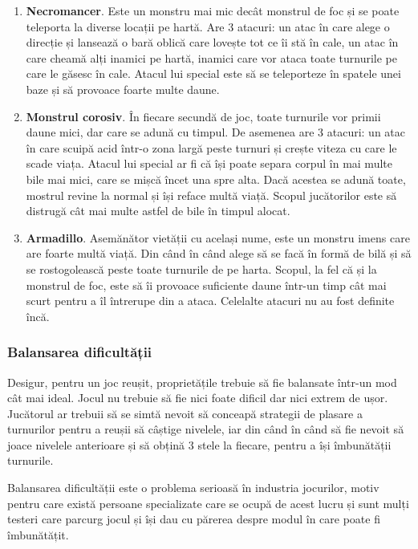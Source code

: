 \documentclass[12pt, a4paper]{article}
\begin{document}
	\begin{enumerate}
		\item \textbf{Necromancer}. Este un monstru mai mic decât monstrul de foc și se poate teleporta la diverse locații pe hartă. Are 3 atacuri: un atac în care alege o direcție și lansează o bară oblică care lovește tot ce îi stă în cale, un atac în care cheamă alți inamici pe hartă, inamici care vor ataca toate turnurile pe care le găsesc în cale. Atacul lui special este să se teleporteze în spatele unei baze și să provoace foarte multe daune.
		\item \textbf{Monstrul corosiv}. În fiecare secundă de joc, toate turnurile vor primii daune mici, dar care se adună cu timpul. De asemenea are 3 atacuri: un atac în care scuipă acid într-o zona largă peste turnuri și crește viteza cu care le scade viața. Atacul lui special ar fi că își poate separa corpul în mai multe bile mai mici, care se mișcă încet una spre alta. Dacă acestea se adună toate, mostrul revine la normal și își reface multă viață. Scopul jucătorilor este să distrugă cât mai multe astfel de bile în timpul alocat.
		\item \textbf{Armadillo}. Asemănător vietății cu același nume, este un monstru imens care are foarte multă viață. Din când în când alege să se facă în formă de bilă și să se rostogolească peste toate turnurile de pe harta. Scopul, la fel că și la monstrul de foc, este să îi provoace suficiente daune într-un timp cât mai scurt pentru a îl întrerupe din a ataca. Celelalte atacuri nu au fost definite încă.
	\end{enumerate}
	
	
	
	\subsubsection{Balansarea dificultății}
	
	Desigur, pentru un joc reușit, proprietățile trebuie să fie balansate într-un mod cât mai ideal. Jocul nu trebuie să fie nici foate dificil dar nici extrem de ușor. Jucătorul ar trebuii să se simtă nevoit să conceapă strategii de plasare a turnurilor pentru a reușii să câștige nivelele, iar din când în când să fie nevoit să joace nivelele anterioare și să obțină 3 stele la fiecare, pentru a își îmbunătății turnurile.
	\newline
	
	Balansarea dificultății este o problema serioasă în industria jocurilor, motiv pentru care există persoane specializate care se ocupă de acest lucru și sunt mulți testeri care parcurg jocul și își dau cu părerea despre modul în care poate fi îmbunătățit.
	
\end{document}
